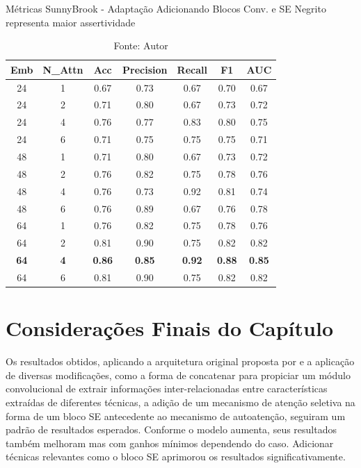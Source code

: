 \begin{table}[htbp]
\centering
\caption{Métricas SunnyBrook - Adaptação Adicionando Blocos Conv. e SE
\newline Negrito representa maior assertividade}
\begin{tabular}{ccccccc}
\toprule
\textbf{Emb} & \textbf{N\_Attn} & \textbf{Acc} & \textbf{Precision} & \textbf{Recall} & \textbf{F1} & \textbf{AUC} \\
\midrule
24 & 1 & 0.67 & 0.73 & 0.67 & 0.70 & 0.67 \\
24 & 2 & 0.71 & 0.80 & 0.67 & 0.73 & 0.72 \\
24 & 4 & 0.76 & 0.77 & 0.83 & 0.80 & 0.75 \\
24 & 6 & 0.71 & 0.75 & 0.75 & 0.75 & 0.71 \\
48 & 1 & 0.71 & 0.80 & 0.67 & 0.73 & 0.72 \\
48 & 2 & 0.76 & 0.82 & 0.75 & 0.78 & 0.76 \\
48 & 4 & 0.76 & 0.73 & 0.92 & 0.81 & 0.74 \\
48 & 6 & 0.76 & 0.89 & 0.67 & 0.76 & 0.78 \\
64 & 1 & 0.76 & 0.82 & 0.75 & 0.78 & 0.76 \\
64 & 2 & 0.81 & 0.90 & 0.75 & 0.82 & 0.82 \\
\textbf{64} & \textbf{4} & \textbf{0.86} & \textbf{0.85} & \textbf{0.92} & \textbf{0.88} & \textbf{0.85} \\
64 & 6 & 0.81 & 0.90 & 0.75 & 0.82 & 0.82 \\
\bottomrule
\end{tabular}
\caption*{Fonte: Autor}
\label{tab:metrics_sunny_se}
\end{table}

\section{Considerações Finais do Capítulo} 
\label{sec:cap6_consideracoes_finais}

Os resultados obtidos, aplicando a arquitetura original proposta por  e a aplicação de diversas modificações, como a forma de concatenar para propiciar um módulo convolucional de extrair informações inter-relacionadas entre características extraídas de diferentes técnicas, a adição de um mecanismo de atenção seletiva na forma de um bloco \gls{SE} antecedente ao mecanismo de autoatenção, seguiram um padrão de resultados esperados. Conforme o modelo aumenta, seus resultados também melhoram mas com ganhos mínimos dependendo do caso. Adicionar técnicas relevantes como o bloco \gls{SE} aprimorou os resultados significativamente.

